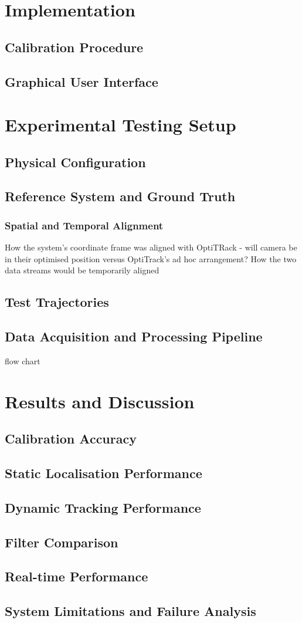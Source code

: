 \section{Implementation}
\subsection{Calibration Procedure}
\subsection{Graphical User Interface}

\section{Experimental Testing Setup}
\subsection{Physical Configuration}
\subsection{Reference System and Ground Truth}
\subsubsection{Spatial and Temporal Alignment}
How the system's coordinate frame was aligned with OptiTRack - will camera be in their optimised position versus OptiTrack's ad hoc arrangement?
How the two data streams would be temporarily aligned 
\subsection{Test Trajectories}
\subsection{Data Acquisition and Processing Pipeline}
flow chart 


\section{Results and Discussion}
\subsection{Calibration Accuracy}
\subsection{Static Localisation Performance}
\subsection{Dynamic Tracking Performance}
\subsection{Filter Comparison}
\subsection{Real-time Performance}
\subsection{System Limitations and Failure Analysis}



